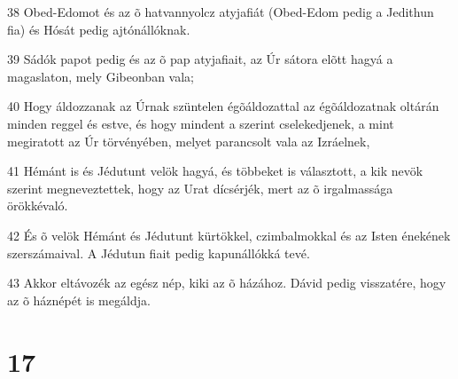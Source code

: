 \par 38 Obed-Edomot és az õ hatvannyolcz atyjafiát (Obed-Edom pedig a Jedithun fia) és Hósát pedig ajtónállóknak.
\par 39 Sádók papot pedig és az õ pap atyjafiait, az Úr sátora elõtt hagyá a magaslaton, mely Gibeonban  vala;
\par 40 Hogy áldozzanak az Úrnak szüntelen égõáldozattal az égõáldozatnak oltárán minden reggel és estve, és hogy mindent a szerint cselekedjenek, a mint megiratott az Úr törvényében, melyet parancsolt vala az Izráelnek,
\par 41 Hémánt is és Jédutunt velök hagyá, és többeket is választott, a kik nevök szerint megneveztettek, hogy az Urat dícsérjék, mert az õ irgalmassága örökkévaló.
\par 42 És õ velök Hémánt és Jédutunt kürtökkel, czimbalmokkal és az Isten énekének szerszámaival. A Jédutun fiait pedig kapunállókká tevé.
\par 43 Akkor eltávozék az egész nép, kiki az õ házához. Dávid pedig visszatére, hogy az õ háznépét is megáldja.

\chapter{17}

